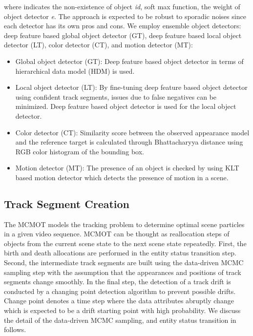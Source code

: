 \documentclass[runningheads]{llncs}
\begin{document}
where  indicates the non-existence of object \textit{id},  soft max function,  the weight of object detector \textit{e}. The approach is expected to be robust to sporadic noises since each detector has its own pros and cons. We employ ensemble object detectors: deep feature based global object detector (GT), deep feature based local object detector (LT), color detector (CT), and motion detector (MT):

\begin{itemize}
    \item[] Global object detector (GT): Deep feature based object detector \cite{Ref28} in terms of hierarchical data model (HDM) \cite{HDM} is used.
    \item[] Local object detector (LT): By fine-tuning deep feature based object detector using confident track segments, issues due to false negatives can be minimized. Deep feature based object detector \cite{Ref28} is used for the local object detector.
    \item[] Color detector (CT): Similarity score between the observed appearance model and the reference target is calculated through Bhattacharyya distance \cite{Ref17} using RGB color histogram of the bounding box.
    \item[] Motion detector (MT): The presence of an object is checked by using KLT based motion detector \cite{Ref26} which detects the presence of motion in a scene. 
\end{itemize}

\subsection{Track Segment Creation}

The MCMOT models the tracking problem to determine optimal scene particles in a given video sequence. MCMOT can be thought as reallocation steps of objects from the current scene state to the next scene state repeatedly. First, the birth and death allocations are performed in the entity status transition step. Second, the intermediate track segments are built using the data-driven MCMC sampling step with the assumption that the appearances and positions of track segments change smoothly. In the final step, the detection of a track drift is conducted by a changing point detection algorithm to prevent possible drifts. Change point denotes a time step where the data attributes abruptly change \cite{Ref24} which is expected to be a drift starting point with high probability. We discuss the detail of the data-driven MCMC sampling, and entity status transition in follows.
\end{document}
